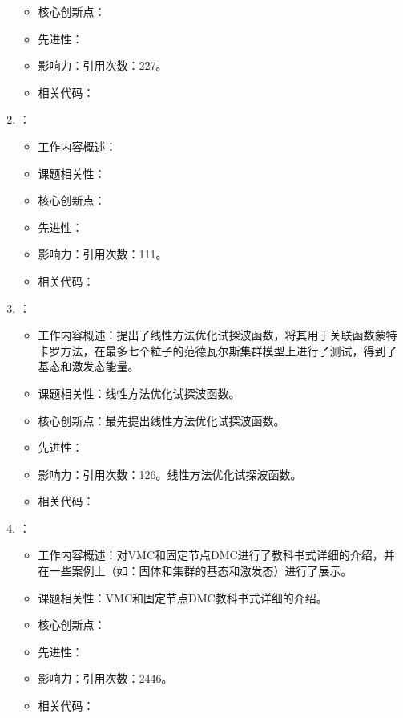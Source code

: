 \begin{enumerate}
\begin{itemize}
                \item 核心创新点：
                \item 先进性：
                \item 影响力：引用次数：227。
                \item 相关代码：
            \end{itemize}
            \item \citet{sorella2000green}：
            \begin{itemize}
                \item 工作内容概述：
                \item 课题相关性：
                \item 核心创新点：
                \item 先进性：
                \item 影响力：引用次数：111。
                \item 相关代码：
            \end{itemize}
        \item \citet{nightingale2001optimization}：
        \begin{itemize}
            \item 工作内容概述：提出了线性方法优化试探波函数，将其用于关联函数蒙特卡罗方法，在最多七个粒子的范德瓦尔斯集群模型上进行了测试，得到了基态和激发态能量。
            \item 课题相关性：线性方法优化试探波函数。
            \item 核心创新点：最先提出线性方法优化试探波函数。
            \item 先进性：
            \item 影响力：引用次数：126。线性方法优化试探波函数。
            \item 相关代码：
        \end{itemize}
        \item \citet{foulkes2001quantum}：
            \begin{itemize}
                \item 工作内容概述：对VMC和固定节点DMC进行了教科书式详细的介绍，并在一些案例上（如：固体和集群的基态和激发态）进行了展示。
                \item 课题相关性：VMC和固定节点DMC教科书式详细的介绍。
                \item 核心创新点：
                \item 先进性：
                \item 影响力：引用次数：2446。
                \item 相关代码：

\end{itemize}
\end{enumerate}
